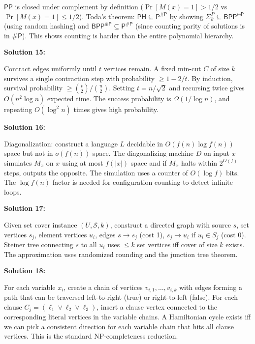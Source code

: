\documentclass[12pt,a4paper]{exam}
\begin{document}
$\mathsf{PP}$ is closed under complement by definition ($\Pr[M(x)=1] > 1/2$ vs $\Pr[M(x)=1] \leq 1/2$). Toda's theorem: $\mathsf{PH} \subseteq \mathsf{P}^{\#\mathsf{P}}$ by showing $\Sigma_k^P \subseteq \mathsf{BPP}^{\oplus\mathsf{P}}$ (using random hashing) and $\mathsf{BPP}^{\oplus\mathsf{P}} \subseteq \mathsf{P}^{\#\mathsf{P}}$ (since counting parity of solutions is in $\#\mathsf{P}$). This shows counting is harder than the entire polynomial hierarchy.

\vspace{0.5cm}

\textbf{Solution 15:}

Contract edges uniformly until $t$ vertices remain. A fixed min-cut $C$ of size $k$ survives a single contraction step with probability $\geq 1 - 2/t$. By induction, survival probability $\geq \binom{t}{2}/\binom{n}{2}$. Setting $t = n/\sqrt{2}$ and recursing twice gives $O(n^2 \log n)$ expected time. The success probability is $\Omega(1/\log n)$, and repeating $O(\log^2 n)$ times gives high probability.

\vspace{0.5cm}

\textbf{Solution 16:}

Diagonalization: construct a language $L$ decidable in $O(f(n)\log f(n))$ space but not in $o(f(n))$ space. The diagonalizing machine $D$ on input $x$ simulates $M_x$ on $x$ using at most $f(|x|)$ space and if $M_x$ halts within $2^{O(f)}$ steps, outputs the opposite. The simulation uses a counter of $O(\log f)$ bits. The $\log f(n)$ factor is needed for configuration counting to detect infinite loops.

\vspace{0.5cm}

\textbf{Solution 17:}

Given set cover instance $(U,\mathcal{S},k)$, construct a directed graph with source $s$, set vertices $s_j$, element vertices $u_i$, edges $s \to s_j$ (cost 1), $s_j \to u_i$ if $u_i \in S_j$ (cost 0). Steiner tree connecting $s$ to all $u_i$ uses $\leq k$ set vertices iff cover of size $k$ exists. The approximation uses randomized rounding and the junction tree theorem.

\vspace{0.5cm}

\textbf{Solution 18:}

For each variable $x_i$, create a chain of vertices $v_{i,1}, \ldots, v_{i,k}$ with edges forming a path that can be traversed left-to-right (true) or right-to-left (false). For each clause $C_j = (\ell_1 \lor \ell_2 \lor \ell_3)$, insert a clause vertex connected to the corresponding literal vertices in the variable chains. A Hamiltonian cycle exists iff we can pick a consistent direction for each variable chain that hits all clause vertices. This is the standard NP-completeness reduction.
\end{document}
